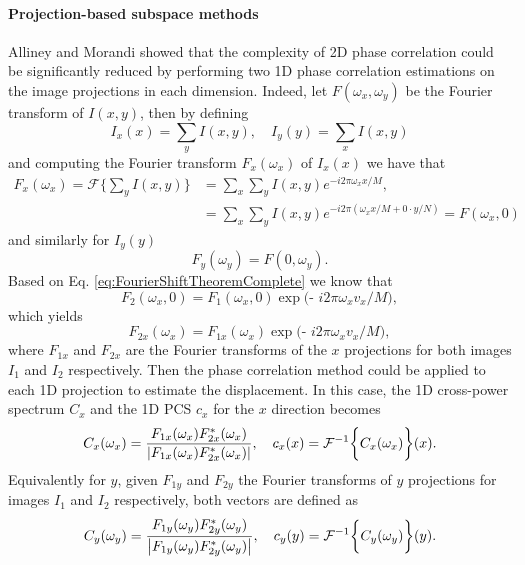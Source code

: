 \paragraph{Projection-based subspace methods}
Alliney and Morandi \cite{Alliney_86} showed that the complexity of 2D phase correlation could be significantly reduced by performing two 1D phase correlation estimations on the image projections in each dimension. Indeed, let $F(\omega_x,\omega_y)$ be the Fourier transform of $I(x,y)$, then by defining  
\begin{equation}
	I_x(x) = \sum_y I(x,y), \quad I_y(y) = \sum_x I(x,y) 	
\end{equation}
and computing the Fourier transform $F_x(\omega_x)$ of $I_x(x)$ we have that
\begin{align}
	F_x(\omega_x) = \mathcal{F}\bigg\{\sum_y I(x,y)\bigg\} &= \sum_x \sum_y I(x,y) e^{-i2\pi\omega_x x/M},\\
	 &= \sum_x \sum_y I(x,y) e^{-i2\pi(\omega_x x/M + 0 \cdot y/N)} = F(\omega_x,0)
\end{align}
and similarly for $I_y(y)$
\begin{equation}
	F_y(\omega_y) = F(0,\omega_y).
\end{equation}
Based on Eq. \eqref{eq:FourierShiftTheoremComplete} we know that 
\begin{equation}
F_2(\omega_x, 0) = F_1(\omega_x, 0) \exp\big(\text{- }i2\pi\omega_x v_x/M\big),
\end{equation}
which yields
\begin{equation}
	F_{2x}(\omega_x) = F_{1x}(\omega_x)  \exp\big(\text{- }i2\pi\omega_x v_x/M\big),
\end{equation}
where $F_{1x}$ and $F_{2x}$ are the Fourier transforms of the $x$ projections for both images $I_1$ and $I_2$ respectively. Then the phase correlation method could be applied to each 1D projection to estimate the displacement. In this case, the 1D cross-power spectrum $C_x$ and the 1D PCS $c_x$ for the $x$ direction becomes
\begin{equation}
	C_x(\omega_x) = \frac{F_{1x}(\omega_x)F_{2x}^*(\omega_x)}{\left\lvert F_{1x}(\omega_x)F_{2x}^*(\omega_x)\right\rvert}, \quad c_x(x) = \mathcal{F}^{-1}\bigg\{C_x(\omega_x)\bigg\}(x).
	\label{eq:projectionPhaseCorrelationX}
\end{equation}
Equivalently for $y$, given $F_{1y}$ and $F_{2y}$ the Fourier transforms of $y$ projections for  images $I_1$ and $I_2$ respectively, both vectors are defined as
\begin{equation}
	C_y(\omega_y) = \frac{F_{1y}(\omega_y)F_{2y}^*(\omega_y)}{\left\lvert F_{1y}(\omega_y)F_{2y}^*(\omega_y)\right\rvert}, \quad c_y(y) = \mathcal{F}^{-1}\bigg\{C_y(\omega_y)\bigg\}(y).
	\label{eq:projectionPhaseCorrelationY}
\end{equation}

